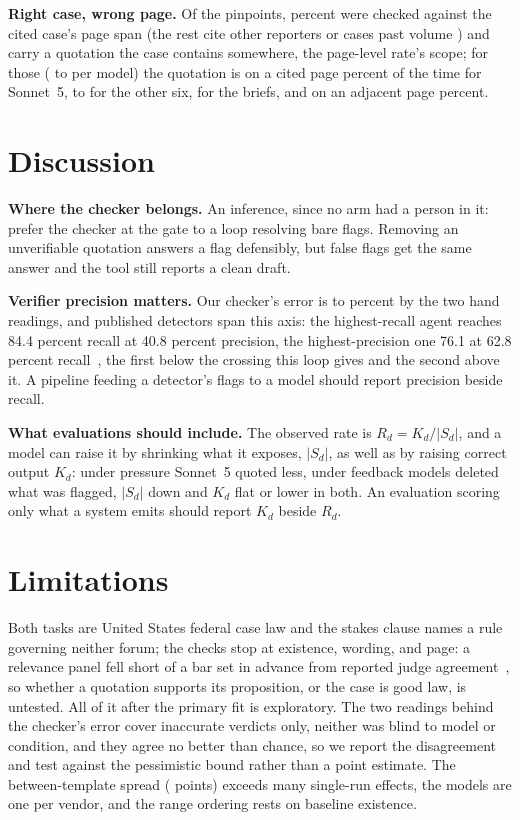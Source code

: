 \documentclass{IOS-Book-Article}
\begin{document}
\textbf{Right case, wrong page.} Of the \pinAllPins{} pinpoints, \pinSpanPct{} percent were checked against the cited case's page span (the rest cite other reporters or cases past volume \capLastVolume) and \pinWithQuote{} carry a quotation the case contains somewhere, the page-level rate's scope; for those (\pinNMin{} to \pinNMax{} per model) the quotation is on a cited page \pinAtSonnet{} percent of the time for Sonnet~5, \pinAtMistral{} to \pinAtGrok{} for the other six, \pinAtHuman{} for the briefs, and on an adjacent page \pinNearPct{} percent.


\section{Discussion}\label{sec:discussion}

\textbf{Where the checker belongs.} An inference, since no arm had a person in it: prefer the checker at the gate to a loop resolving bare flags. Removing an unverifiable quotation answers a flag defensibly, but false flags get the same answer and the tool still reports a clean draft.

\textbf{Verifier precision matters.} Our checker's error is \twoRaterOnePct{} to \twoRaterTwoPct{} percent by the two hand readings, and published detectors span this axis: the highest-recall agent reaches 84.4 percent recall at 40.8 percent precision, the highest-precision one 76.1 at 62.8 percent recall~\cite{liu2026whochecks}, the first below the crossing this loop gives and the second above it. A pipeline feeding a detector's flags to a model should report precision beside recall.

\textbf{What evaluations should include.} The observed rate is $R_d = K_d / |S_d|$, and a model can raise it by shrinking what it exposes, $|S_d|$, as well as by raising correct output $K_d$: under pressure Sonnet~5 quoted less, under feedback models deleted what was flagged, $|S_d|$ down and $K_d$ flat or lower in both. An evaluation scoring only what a system emits should report $K_d$ beside $R_d$.

\section{Limitations}\label{sec:limits}

\enlargethispage{\baselineskip}%
Both tasks are United States federal case law and the stakes clause names a rule governing neither forum; the checks stop at existence, wording, and page: a relevance panel fell short of a \juryBar{} bar set in advance from reported judge agreement~\cite{zheng2023judging}, so whether a quotation supports its proposition, or the case is good law, is untested. All of it after the primary fit is exploratory. The two readings behind the checker's error cover inaccurate verdicts only, neither was blind to model or condition, and they agree no better than chance, so we report the disagreement and test against the pessimistic bound rather than a point estimate. The between-template spread (\phrMaxStrictDiff{} points) exceeds many single-run effects, the models are one per vendor, and the range ordering rests on baseline existence.
\end{document}
